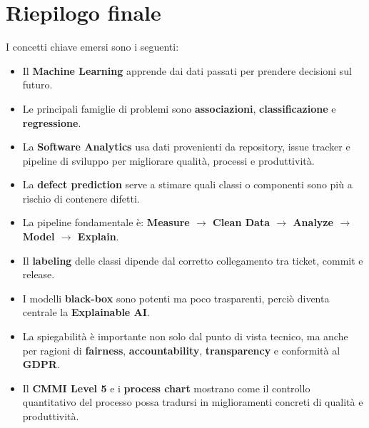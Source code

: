 \section{Riepilogo finale}

I concetti chiave emersi sono i seguenti:
\begin{itemize}
    \item Il \textbf{Machine Learning} apprende dai dati passati per prendere decisioni sul futuro.
    \item Le principali famiglie di problemi sono \textbf{associazioni}, \textbf{classificazione} e \textbf{regressione}.
    \item La \textbf{Software Analytics} usa dati provenienti da repository, issue tracker e pipeline di sviluppo per migliorare qualità, processi e produttività.
    \item La \textbf{defect prediction} serve a stimare quali classi o componenti sono più a rischio di contenere difetti.
    \item La pipeline fondamentale è: \textbf{Measure $\rightarrow$ Clean Data $\rightarrow$ Analyze $\rightarrow$ Model $\rightarrow$ Explain}.
    \item Il \textbf{labeling} delle classi dipende dal corretto collegamento tra ticket, commit e release.
    \item I modelli \textbf{black-box} sono potenti ma poco trasparenti, perciò diventa centrale la \textbf{Explainable AI}.
    \item La spiegabilità è importante non solo dal punto di vista tecnico, ma anche per ragioni di \textbf{fairness}, \textbf{accountability}, \textbf{transparency} e conformità al \textbf{GDPR}.
    \item Il \textbf{CMMI Level 5} e i \textbf{process chart} mostrano come il controllo quantitativo del processo possa tradursi in miglioramenti concreti di qualità e produttività.
\end{itemize}